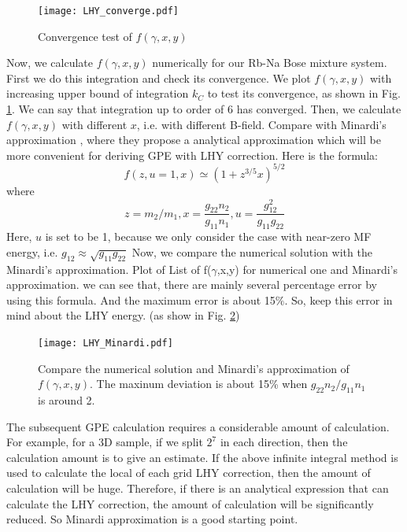 \begin{figure}[htb]
\begin{center}
\texttt{[image: LHY\_converge.pdf]}
\end{center}
\caption[Convergence test of $f(\gamma ,x,y)$]{Convergence test of $f(\gamma ,x,y)$}  
\label{LHY_converge}
\end{figure}

Now, we calculate $f(\gamma ,x,y)$ numerically for our Rb-Na Bose mixture system. First we do this integration and check its convergence. We plot $f(\gamma ,x,y)$ with increasing upper bound of integration $k_C$ to test its convergence, as shown in Fig. \ref{LHY_converge}. We can say that integration up to order of 6 has converged. Then, we calculate $f(\gamma ,x,y)$ with different $x$, i.e. with different B-field. Compare with Minardi's approximation
\cite{Minardi2019}, where they propose a analytical approximation which will be more convenient for deriving GPE with LHY correction. Here is the formula:
\begin{equation}
f(z,u=1,x)\simeq \left(1+z^{3/5}x\right)^{5/2}
\end{equation}
where
\begin{equation}
z=m_2/m_1, x=\frac{g_{22}n_2}{g_{11}n_1},u=\frac{g_{12}^2}{g_{11}g_{22}}
\end{equation}
Here, $u$ is set to be 1, because we only consider the case with near-zero MF energy, i.e. $g_{12}\approx\sqrt{g_{11}g_{22}}$ Now, we compare the numerical solution with the Minardi's approximation. Plot of List of f($\gamma $,x,y) for numerical one and Minardi's approximation. we can see that, there are mainly several percentage error by using this formula. And the maximum error is about 15$\%$. So, keep this error in mind about the LHY energy. (as show in Fig. \ref{LHY_Minardi})

\begin{figure}[htb]
\begin{center}
\texttt{[image: LHY\_Minardi.pdf]}
\end{center}
\caption[Compare the numerical solution and Minardi's approximation of $f(\gamma ,x,y)$]{Compare the numerical solution and Minardi's approximation of $f(\gamma ,x,y)$. The maxinum deviation is about 15\% when $g_{22}n_2/g_{11}n_1$ is around 2.}
\label{LHY_Minardi}
\end{figure}

The subsequent GPE calculation requires a considerable amount of calculation. For example, for a 3D sample, if we split $2^7$ in each direction, then the calculation amount is to give an estimate. If the above infinite integral method is used to calculate the local of each grid LHY correction, then the amount of calculation will be huge. Therefore, if there is an analytical expression that can calculate the LHY correction, the amount of calculation will be significantly reduced. So Minardi approximation is a good starting point.

